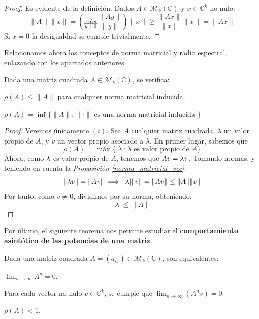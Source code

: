 \begin{proof} Es evidente de la definición. Dados $A \in \mathcal M_k(\mathbb{C})$ y $x \in \mathbb{C}^k$ no nulo: $$\|A\|\|x\| = \left(\underset{y \ne 0}{\text{máx}} \frac{\|Ay\|}{\|y\|}\right)\|x\| \ge \frac{\|Ax\|}{\|x\|}\|x\| = \|Ax\|$$ Si $x = 0$ la desigualdad se cumple trivialmente.
\end{proof}

Relacionamos ahora los conceptos de norma matricial y radio espectral, enlazando con los apartados anteriores.

\begin{nprop}
    Dada una matriz cuadrada $A \in \mathcal M_k(\mathbb{C})$, se verifica: \begin{nlist}
        \item $\rho(A) \leq \|A\|$ para cualquier norma matricial inducida.
        \item $\rho(A) = \text{ ínf } \{\|A\| : \|\cdot\| \text{ es una norma matricial inducida } \}$
    \end{nlist}
\end{nprop}

\begin{proof} Veremos únicamente $(i)$. Sea $A$ cualquier matriz cuadrada, $\lambda$ un valor propio de $A$, y $v$ un vector propio asociado a $\lambda$. En primer lugar, sabemos que $$\rho(A) = \text{ máx } \{ |\lambda| : \lambda \text{ es valor propio de } A \}$$ Ahora, como $\lambda$ es valor propio de $A$, tenemos que $Av = \lambda v$. Tomando normas, y teniendo en cuenta la \textit{Proposición \ref{norma_matricial_vec}}:
$$\|\lambda v\| = \|Av\| \implies |\lambda|\|v\| = \|Av\| \le \|A\|\|v\|$$
Por tanto, como $v\ne 0$, dividimos por su norma, obteniendo: $$|\lambda| \le \|A\|$$\end{proof}

Por último, el siguiente teorema nos permite estudiar el \textbf{comportamiento asintótico de las potencias de una matriz}.
\begin{nth}
    Dada una matriz cuadrada $A = (a_{ij})\in \mathcal M_k(\mathbb C)$, son equivalentes:
    \begin{nlist}
        \item $\displaystyle \lim_{n \to \infty} A^n = 0$.
        \item Para cada vector no nulo $v \in \mathbb C^{k}$, se cumple que $\displaystyle \lim_{n \to \infty}(A^n v) = 0$.
        \item $\rho(A) < 1$.
    \end{nlist}
\end{nth}


